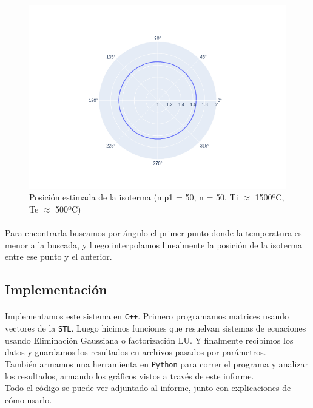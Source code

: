 \documentclass[12pt]{article}
\begin{document}
\begin{figure}[H]
\centering
\includegraphics[scale=0.5]{complete.0.isotherm}
\caption{Posición estimada de la isoterma (mp1 = 50, n = 50, Ti \(\approx\) 1500ºC, Te \(\approx\) 500ºC)}
\label{fig:isotherm.pos}
\end{figure}

\paragraph{} Para encontrarla buscamos por ángulo el primer punto donde la temperatura es menor a la buscada, y luego interpolamos linealmente la posición de la isoterma entre ese punto y el anterior.

\subsection{Implementación}

\paragraph{} Implementamos este sistema en \texttt{C++}. Primero programamos matrices usando vectores de la \texttt{STL}. Luego hicimos funciones que resuelvan sistemas de ecuaciones usando Eliminación Gaussiana o factorización LU. Y finalmente recibimos los datos y guardamos los resultados en archivos pasados por parámetros. \\
También armamos una herramienta en \texttt{Python} para correr el programa y analizar los resultados, armando los gráficos vistos a través de este informe. \\
Todo el código se puede ver adjuntado al informe, junto con explicaciones de cómo usarlo. \\
\end{document}

